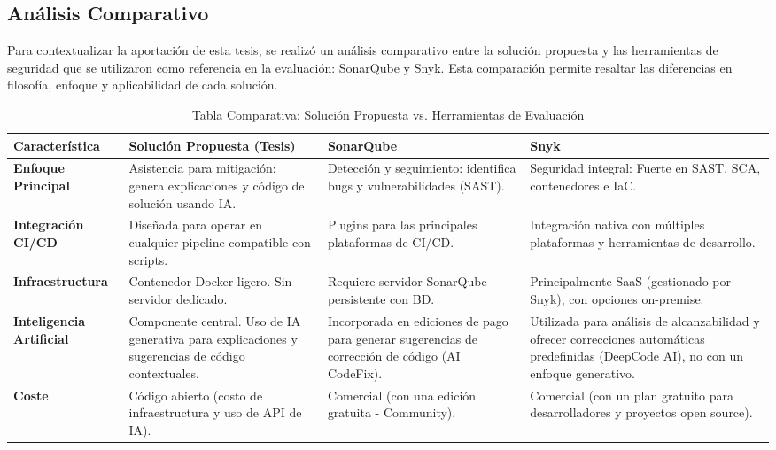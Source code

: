 \subsection{Análisis Comparativo}

Para contextualizar la aportación de esta tesis, se realizó un análisis comparativo entre la solución propuesta y las herramientas de seguridad que se utilizaron como referencia en la evaluación: SonarQube y Snyk. Esta comparación permite resaltar las diferencias en filosofía, enfoque y aplicabilidad de cada solución.

\begin{table}[h!]
\centering
\caption{Tabla Comparativa: Solución Propuesta vs. Herramientas de Evaluación}
\label{tab:comparativa_sistemas}
\begin{tabular}{|p{2.6cm}|p{3.9cm}|p{3.9cm}|p{3.9cm}|}
\hline
\textbf{Característica} & 
\textbf{Solución Propuesta (Tesis)} & 
\textbf{SonarQube} \cite{sonarqube_editions} & 
\textbf{Snyk} \cite{snyk_plans} \\ \hline

\textbf{Enfoque Principal} & 
Asistencia para mitigación: genera explicaciones y código de solución usando IA. & 
Detección y seguimiento: identifica bugs y vulnerabilidades (SAST). & 
Seguridad integral: Fuerte en SAST, SCA, contenedores e IaC. \\ \hline

\textbf{Integración CI/CD} & 
Diseñada para operar en cualquier pipeline compatible con scripts. & 
Plugins para las principales plataformas de CI/CD. & 
Integración nativa con múltiples plataformas y herramientas de desarrollo. \\ \hline

\textbf{Infraestructura} & 
Contenedor Docker ligero. Sin servidor dedicado. & 
Requiere servidor SonarQube persistente con BD. & 
Principalmente SaaS (gestionado por Snyk), con opciones on-premise. \\ \hline

\textbf{Inteligencia Artificial} & 
Componente central. Uso de IA generativa para explicaciones y sugerencias de código contextuales. & 
Incorporada en ediciones de pago para generar sugerencias de corrección de código (AI CodeFix). & 
Utilizada para análisis de alcanzabilidad y ofrecer correcciones automáticas predefinidas (DeepCode AI), no con un enfoque generativo. \\ \hline

\textbf{Coste} & 
Código abierto (costo de infraestructura y uso de API de IA). & 
Comercial (con una edición gratuita - Community). & 
Comercial (con un plan gratuito para desarrolladores y proyectos open source). \\ \hline

\end{tabular}
\end{table}



